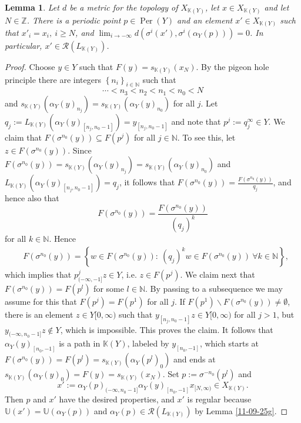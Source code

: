 \documentclass[12pt,oneside,english]{amsart}
\newcommand{\Per}{\operatorname{Per}}
\newtheorem{lemma}[thm]{Lemma}
\begin{document}
\begin{lemma}\label{11-09-25ix} Let $d$ be a metric for the topology of $X_{\mathbb K(Y)}$, let $x \in X_{\mathbb K(Y)}$ and let $N\in \mathbb Z$. There is a periodic point $p \in \Per(Y)$ and an element $x' \in X_{\mathbb K(Y)}$ such that $x'_i = x_i, \ i \geq N$, and $\lim_{i \to -\infty} d(\sigma^i(x'),\sigma^i(\alpha_Y(p))) = 0$. In particular, $x' \in \mathcal R(L_{\mathbb K(Y)})$.
\end{lemma}
\begin{proof} Choose $y \in Y$ such that $F(y) = s_{\mathbb K(Y)}(x_N)$. By the pigeon hole principle there are integers 
$\left\{n_i\right\}_{i \in \mathbb N}$ such that 
$$\cdots < n_3 < n_2 <n_1 < n_0 < N
$$ 
and $s_{\mathbb K(Y)}(\alpha_Y(y)_{n_j}) = s_{\mathbb K(Y)}(\alpha_Y(y)_{n_0})$ for all $j$. Let $q_j := L_{\mathbb K(Y)}(\alpha_Y(y)_{[n_j,n_0-1]}) = y_{[n_j,n_0-1]}$ and note that $p^j := q_j^{\infty} \in Y$. We claim that $F(\sigma^{n_0}(y)) \subseteq F(p^j)$ for all $j \in \mathbb N$.
To see this, let $z \in F(\sigma^{n_0}(y))$.
Since $F(\sigma^{n_0}(y)) = s_{\mathbb K(Y)}(\alpha_Y(y)_{n_j}) =s_{\mathbb K(Y)}(\alpha_Y(y)_{n_0})$ and $L_{\mathbb K(Y)}(\alpha_Y(y)_{[n_j,n_0-1]}) = q_j$, it follows that $F(\sigma^{n_0}(y)) = \frac{ F(\sigma^{n_0}(y))}{q_j}$, and hence also that
$$
F(\sigma^{n_0}(y)) = \frac{ F(\sigma^{n_0}(y))}{(q_j)^k}
$$
for all $k \in \mathbb N$. Hence
\begin{align*}
&F(\sigma^{n_0}(y)) = \left\{w \in F(\sigma^{n_0}(y)) : \ (q_j)^k w \in F(\sigma^{n_0}(y))\  \forall k \in \mathbb N \right\} ,
\end{align*} 
which implies that $p^j_{(-\infty,-1]}z \in  Y$, i.e. $z \in F(p^j)$.
 We claim next that $F(\sigma^{n_0}(y)) = F(p^l)$ for some $l \in \mathbb N$. By passing to a subsequence we may assume for this that $F(p^j) = F(p^1)$ for all $j$. If $F(p^1) \backslash F(\sigma^{n_0}(y)) \neq \emptyset$, there is an element $z \in Y[0,\infty)$ such that $y_{[n_j,n_0-1]}z \in Y[0,\infty)$ for all $j > 1$, but $y_{(-\infty,n_0-1]}z \notin Y$, which is impossible. This proves the claim. It follows that $\alpha_Y(y)_{[n_0,-1]}$ is a path in $\mathbb K(Y)$, labeled by $y_{[n_0,-1]}$, which starts at $ F(\sigma^{n_0}(y)) =F(p^l) = s_{\mathbb K(Y)}(\alpha_Y(p^l)_0)$ and ends at $s_{\mathbb K(Y)}(\alpha_Y(y)_0) = F(y)= s_{\mathbb K(Y)}(x_N)$. Set $p:= \sigma^{-n_0}(p^l)$ and 
 $$
 x':= \alpha_Y(p)_{(-\infty,n_0-1]}\alpha_Y(y)_{[n_0,-1]}x_{[N,\infty)} \in X_{\mathbb K(Y)}.
 $$ 
  Then $p$ and $x'$ have the desired properties, and $x'$ is regular because $\mathbb U(x') = \mathbb U(\alpha_Y(p))$ and $\alpha_Y(p) \in \mathcal R(L_{\mathbb K(Y)})$ by Lemma \ref{11-09-25g}. 
 



\end{proof}
\end{document}
